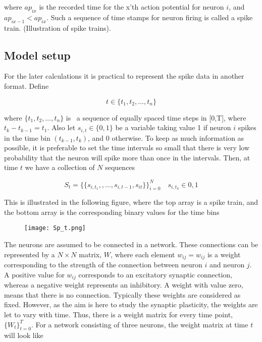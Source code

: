 where $ap_{ix}$ is the recorded time for the x'th action potential for neuron $i$, and $ap_{ix-1} < ap_{ix}$. Such a sequence of time stamps for neuron firing is called a spike train. (Illustration of spike trains).\\



\subsection{Model setup}
\label{set_up}

For the later calculations it is practical to represent the spike data in another format. Define

\begin{equation}
    t \in \{t_1, t_2, ..., t_n\} 
\end{equation}

 where $\{t_1, t_2, ..., t_n\}$ is \ a sequence of equally spaced time steps in [0,T], where $t_{k}-t_{k-1} = t_1$. Also let $s_{i,t} \in \{0,1\}$ be a variable taking value 1 if neuron $i$ spikes in the time bin $(t_{k-1}, t_{k})$, and 0 otherwise. To keep as much information as possible, it is preferable to set the time intervals so small that there is very low probability that the neuron will spike more than once in the intervals. Then, at time $t$ we have a collection of $N$ sequences

\begin{equation}
    S_{t} = \{\{s_{i,t_1}, ,...,s_{i,t-1},s_{it}\}\}_{i=0}^{N} \quad s_{i,t_k} \in {0,1}
\end{equation}

This is illustrated in the following figure, where the top array is a spike train, and the bottom array is the corresponding binary values for the time bins

\begin{figure}[h]
    \centering
    \texttt{[image: Sp\_t.png]}
\end{figure} 

The neurons are assumed to be connected in a network. These connections can be represented by a $N \times N$ matrix, $W$, where each element $w_{ij}=w_{ij}$ is a weight corresponding to the strength of the connection between neuron $i$ and neuron $j$. A positive value for $w_{ij}$ corresponds to an excitatory synaptic connection, whereas a negative weight represents an inhibitory. A weight with value zero, means that there is no connection. 
Typically these weights are considered as fixed. However, as the aim is here to study the synaptic plasticity, the weights are let to vary with time. Thus, there is a weight matrix for every time point, $\{W_t\}_{t=0}^{T}$. For a network consisting of three neurons, the weight matrix at time $t$ will look like

